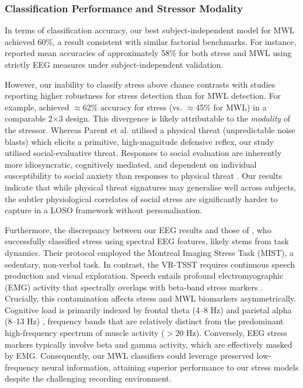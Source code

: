 \documentclass[lettersize,journal]{IEEEtran}
\begin{document}
\subsubsection{Classification Performance and Stressor Modality}
In terms of classification accuracy, our best subject-independent model for MWL achieved 60\%, a result consistent with similar factorial benchmarks. For instance, \cite{bagheriSimultaneousClassificationBoth2022} reported mean accuracies of approximately 58\% for both stress and MWL using strictly EEG measures under subject-independent validation. 

However, our inability to classify stress above chance contrasts with studies reporting higher robustness for stress detection than for MWL detection. For example, \cite{parentDiagnosticityPsychophysiologicalSignatures2019} achieved $\approx$62\% accuracy for stress (vs. $\approx$45\% for MWL) in a comparable 2$\times$3 design. This divergence is likely attributable to the \textit{modality} of the stressor. Whereas Parent et al. utilised a physical threat (unpredictable noise blasts) which elicits a primitive, high-magnitude defensive reflex, our study utilised social-evaluative threat. Responses to social evaluation are inherently more idiosyncratic, cognitively mediated, and dependent on individual susceptibility to social anxiety than responses to physical threat \cite{campbell-sillsPsychometricPropertiesSubjective2006}. Our results indicate that while physical threat signatures may generalise well across subjects, the subtler physiological correlates of social stress are significantly harder to capture in a LOSO framework without personalisation.

Furthermore, the discrepancy between our EEG results and those of \cite{bagheriSimultaneousClassificationBoth2022}, who successfully classified stress using spectral EEG features, likely stems from task dynamics. Their protocol employed the Montreal Imaging Stress Task (MIST), a sedentary, non-verbal task. In contrast, the VR-TSST requires continuous speech production and visual exploration. Speech entails profound electromyographic (EMG) activity that spectrally overlaps with beta-band stress markers \cite{goncharovaEMGContaminationEEG2003}. Crucially, this contamination affects stress and MWL biomarkers asymmetrically. Cognitive load is primarily indexed by frontal theta (4--8 Hz) and parietal alpha (8--13 Hz) \cite{klimeschEEGAlphaTheta1999}, frequency bands that are relatively distinct from the predominant high-frequency spectrum of muscle activity ($>$20 Hz). Conversely, EEG stress markers typically involve beta and gamma activity, which are effectively masked by EMG. Consequently, our MWL classifiers could leverage preserved low-frequency neural information, attaining superior performance to our stress models despite the challenging recording environment.
\end{document}
